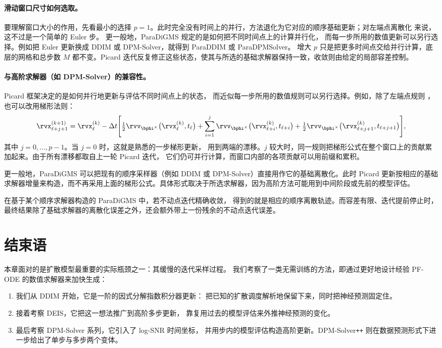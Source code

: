 \paragraph{滑动窗口尺寸如何选取。}
要理解窗口大小的作用，先看最小的选择 $p=1$。此时完全没有时间上的并行，方法退化为它对应的顺序基础更新；对左端点离散化
 来说，这不过是一个简单的 Euler 步。
更一般地，ParaDiGMS 规定的是如何把不同时间点上的计算并行化，
而每一步所用的数值更新可以另行选择。例如把 Euler 更新换成
DDIM 或 DPM-Solver，就得到 ParaDDIM 或 ParaDPMSolver。
增大 $p$ 只是把更多时间点交给并行计算，底层的网格和总步数 $M$
都不变。Picard 迭代反复修正这些状态，使其与所选的基础求解器保持一致，收敛则由给定的局部容差控制。

\paragraph{与高阶求解器（如 DPM-Solver）的兼容性。}
Picard 框架决定的是如何并行地更新与评估不同时间点上的状态，
而近似每一步所用的数值规则可以另行选择。例如，除了左端点规则
，也可以改用梯形法则：
\begin{align*}
\rvx^{(k+1)}_{\ell+j+1}
=
\rvx^{(k)}_{\ell}
-\Delta t\Bigg[
\tfrac{1}{2}
\rvv_{\bphi^\times}
\big(\rvx^{(k)}_{\ell},t_{\ell}\big)
+
\sum_{i=1}^{j}
\rvv_{\bphi^\times}
\big(\rvx^{(k)}_{\ell+i},t_{\ell+i}\big)
+
\tfrac{1}{2}
\rvv_{\bphi^\times}
\big(\rvx^{(k)}_{\ell+j+1},t_{\ell+j+1}\big)
\Bigg],
\end{align*}
其中 $j=0,\ldots,p-1$。当 $j=0$ 时，这就是熟悉的一步梯形更新，
用到两端的漂移。$j$ 较大时，同一规则把梯形公式在整个窗口上的贡献累加起来。由于所有漂移都取自上一轮 Picard 迭代，
它们仍可并行计算，而窗口内部的各项贡献可以用前缀和累积。

更一般地，ParaDiGMS 可以把现有的顺序采样器（例如 DDIM 或
DPM-Solver）直接用作它的基础离散化。此时 Picard 更新按相应的基础求解器增量来构造，而不再采用上面的梯形公式。具体形式取决于所选求解器，因为高阶方法可能用到中间阶段或先前的模型评估。

在基于某个顺序求解器构造的 ParaDiGMS 中，若不动点迭代精确收敛，
得到的就是相应的顺序离散轨迹。而容差有限、迭代提前停止时，
最终结果除了基础求解器的离散化误差之外，还会额外带上一份残余的不动点迭代误差。

\section{结束语}\label{sec:ch9_cr}

本章面对的是扩散模型最重要的实际瓶颈之一：其缓慢的迭代采样过程。
我们考察了一类无需训练的方法，即通过更好地设计经验 PF-ODE 的数值求解器来加快生成：
\begin{enumerate}
    \item 我们从 DDIM 开始，它是一阶的因式分解指数积分器更新：
    把已知的扩散调度解析地保留下来，同时把神经预测固定住。
    \item 接着考察 DEIS，它把这一想法推广到高阶多步更新，
    靠复用过去的模型评估来外推神经预测的变化。
    \item 最后考察 DPM-Solver 系列，它引入了 log-SNR 时间坐标，
    并用步内的模型评估构造高阶更新。DPM-Solver\texttt{++}
    则在数据预测形式下进一步给出了单步与多步两个变体。
\end{enumerate}


